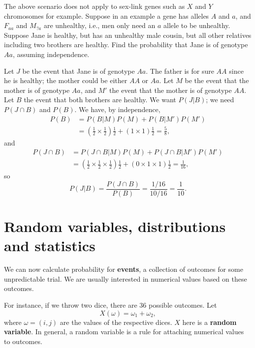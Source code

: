\documentclass[letter-paper]{tufte-book}
\newenvironment{example}[1][Example]{\begin{trivlist}
\item[\hskip \labelsep {\bfseries #1}]}{\end{trivlist}}
\newcommand\Def[1]{\textbf{#1}}
\begin{document}
\begin{example}
  The above scenario does not apply to sex-link genes such as $X$ and $Y$
  chromosomes for example. Suppose in an example a gene has alleles $A$ and $a$,
  and $F_{aa}$ and $M_{?a}$ are unhealthy, i.e., men only need an $a$ allele to
  be unhealthy. Suppose Jane is healthy, but has an unhealthy male cousin, but
  all other relatives including two brothers are healthy. Find the probability
  that Jane is of genotype $Aa$, assuming independence.
  
  Let $J$ be the event that Jane is of genotype $Aa$. The father is for sure
  $AA$ since he is healthy; the mother could be either $AA$ or $Aa$. Let $M$ be
  the event that the mother is of genotype $Aa$, and $M'$ the event that the
  mother is of genotype $AA$. Let $B$ the event that both brothers are healthy.
  We want $P(J|B)$; we need $P(J\cap B)$ and $P(B)$. We have, by independence,
  \begin{align*}
    P(B) &= P(B|M)P(M)+P(B|M')P(M')\\
    &=\left(\frac{1}{2}\times\frac{1}{2}\right)\frac{1}{2}+(1\times1)\frac{1}{2}=\frac{5}{8},
  \end{align*}
  and
  \begin{align*}
    P(J\cap B) &= P(J\cap B|M)P(M)+P(J\cap B|M')P(M')\\
    &=\left(\frac{1}{2}\times\frac{1}{2}\times\frac{1}{2}\right)\frac{1}{2} + (0\times1\times1)\frac{1}{2}=\frac{1}{16},
  \end{align*}
  so
  \begin{equation*}
    P(J|B)=\frac{P(J\cap B)}{P(B)}=\frac{1/16}{10/16}=\frac{1}{10}.
  \end{equation*}
\end{example}


\section{Random variables, distributions and statistics}

We can now calculate probability for \Def{events}, a collection of
outcomes for some unpredictable trial. We are usually interested in numerical
values based on these outcomes.

For instance, if we throw two dice, there are 36 possible outcomes. Let
\begin{equation*}
  X(\omega) = \omega_1 + \omega_2,
\end{equation*}
where $\omega=(i,j)$ are the values of the respective dices. $X$ here is a
\Def{random variable}. In general, a random variable is a rule for
attaching numerical values to outcomes.
\end{document}
